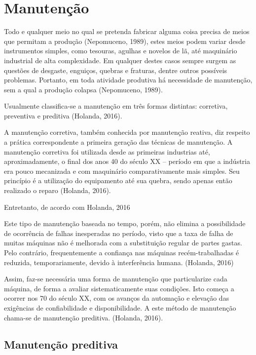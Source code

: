 \documentclass[
	12pt,				
	oneside,			
	a4paper,			
	english,			
	brazil				
	]{abntex2ppgsi}
\begin{document}
\section{\textbf{Manutenção}}
Todo e qualquer meio no qual se pretenda fabricar alguma coisa precisa de meios que permitam a produção (Nepomuceno, 1989), estes meios podem variar desde instrumentos simples, como tesouras, agulhas e novelos de lã, até maquinário industrial de alta complexidade. 
Em qualquer destes casos sempre surgem as questões de desgaste, enguiços, quebras e fraturas, dentre outros possíveis problemas. Portanto, em toda atividade produtiva  há necessidade de manutenção, sem a qual a produção colapsa (Nepomuceno, 1989).

	Usualmente classifica-se a manutenção em três formas distintas: corretiva, preventiva e preditiva (Holanda, 2016). 

	A manutenção corretiva, também conhecida por manutenção reativa, diz respeito a prática correspondente a primeira geração das técnicas de manutenção. A manutenção corretiva foi utilizada desde as primeiras industrias até, aproximadamente, o final dos anos 40 do século XX – período em que a indústria era pouco mecanizada e com maquinário comparativamente mais simples. Seu princípio é a utilização do equipamento até sua quebra, sendo apenas então realizado o reparo (Holanda, 2016). 
	
Entretanto, de acordo com Holanda, 2016	

\begin{citacao}

	Este tipo de manutenção baseada no tempo, porém, não elimina a possibilidade de ocorrência de falhas inesperadas no período, visto que a taxa de falha de 	muitas máquinas não é melhorada com a substituição regular de partes gastas. Pelo contrário, frequentemente a confiança nas máquinas recém-trabalhadas é 		reduzida, temporariamente, devido à interferência humana. (Holanda, 2016)

\end{citacao}

Assim, faz-se necessária uma forma de manutenção que particularize cada máquina, de forma a avaliar sistematicamente suas condições. Isto começa a ocorrer nos 70 do século XX, com os avanços da automação e elevação das exigências de confiabilidade e disponibilidade. A este método de manutenção chama-se de manutenção preditiva. (Holanda, 2016).  


\subsection{\textbf{Manutenção preditiva}}
\end{document}
